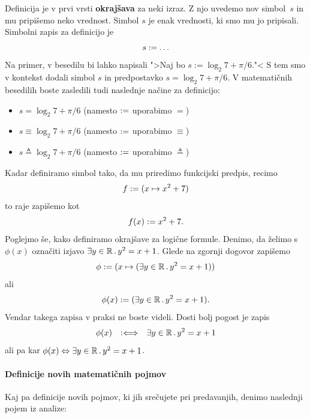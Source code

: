 Definicija je v prvi vrsti \textbf{okrajšava} za neki izraz. Z njo uvedemo nov simbol~$s$ in mu pripišemo neko vrednost. Simbol $s$ je enak vrednosti, ki smo mu jo pripisali. Simbolni zapis za definicijo je
%
\begin{equation*}
  s \mathrel{{:}{=}} \ldots
\end{equation*}
%
Na primer, v besedilu bi lahko napisali ">Naj bo $s := \log_2 7 + \pi/6$."< S tem smo v kontekst dodali simbol $s$ in predpostavko $s = \log_2 7 + \pi/6$. V matematičnih besedilih boste zasledili tudi naslednje načine za definicijo:
%
\begin{itemize}
\item $s = \log_2 7 + \pi/6$ (namesto $\mathrel{{:}{=}}$ uporabimo $=$)
\item $s \equiv \log_2 7 + \pi/6$ (namesto $\mathrel{{:}{=}}$ uporabimo $\equiv$)
\item $s \triangleq \log_2 7 + \pi/6$ (namesto $\mathrel{{:}{=}}$ uporabimo $\triangleq$)
\end{itemize}
%
Kadar definiramo simbol tako, da mu priredimo funkcijski predpis, recimo
%
\begin{equation*}
  f \mathrel{{:}{=}} (x \mapsto x^2 + 7)
\end{equation*}
%
to raje zapišemo kot
%
\begin{equation*}
  f(x) \mathrel{{:}{=}} x^2 + 7.
\end{equation*}
%
Poglejmo še, kako definiramo okrajšave za logične formule. Denimo, da želimo s $\phi(x)$ označiti izjavo $\exists y \in \mathbb{R} \,.\, y^2 = x + 1$. Glede na zgornji dogovor zapišemo
%
\begin{equation*}
  \phi \mathrel{{:}{=}} (x \mapsto (\exists y \in \mathbb{R} \,.\, y^2 = x + 1))
\end{equation*}
%
ali
%
\begin{equation*}
  \phi(x) \mathrel{{:}{=}} (\exists y \in \mathbb{R} \,.\, y^2 = x + 1).
\end{equation*}
%
Vendar takega zapisa v praksi ne boste videli. Dosti bolj pogost je zapis
%
\begin{equation*}
  \phi(x) \quad {{:}{\Longleftrightarrow}}\quad \exists y \in \mathbb{R} \,.\, y^2 = x + 1
\end{equation*}
%
ali pa kar $\phi(x) \Leftrightarrow \exists y \in \mathbb{R} \,.\, y^2 = x + 1$.

\paragraph*{Definicije novih matematičnih pojmov}

Kaj pa definicije novih pojmov, ki jih srečujete pri predavanjih, denimo naslednji pojem iz analize:

